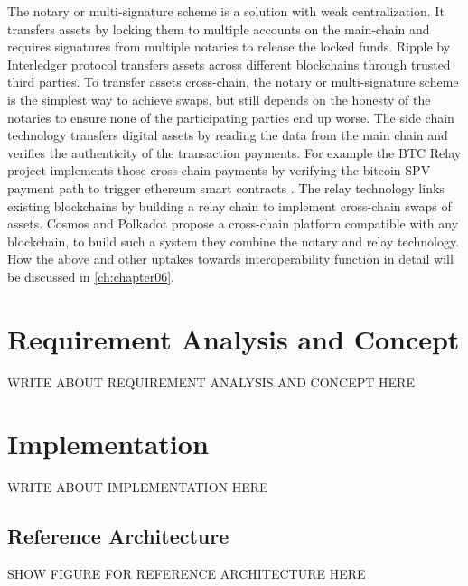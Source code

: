 The notary or multi-signature scheme is a solution with weak centralization. It transfers assets by locking them to multiple accounts on the main-chain and requires signatures from multiple notaries to release the locked funds. Ripple by Interledger protocol \cite{hope2016interledger} transfers assets across different blockchains through trusted third parties. To transfer assets cross-chain, the notary or multi-signature scheme is the simplest way to achieve swaps, but still depends on the honesty of the notaries to ensure none of the participating parties end up worse. The side chain technology transfers digital assets by reading the data from the main chain and verifies the authenticity of the transaction payments. For example the BTC Relay  project implements those cross-chain payments by verifying the bitcoin \ac{SPV} payment path to trigger ethereum smart contracts \cite{buterin2014ethereum}. The relay technology links existing blockchains by building a relay chain to implement cross-chain swaps of assets. Cosmos \cite{kwon2018network} and Polkadot \cite{wood2016polkadot} propose a cross-chain platform compatible with any blockchain, to build such a system they combine the notary and relay technology. How the above and other uptakes towards interoperability function in detail will be discussed in \autoref{ch:chapter06}.


\chapter{Requirement Analysis and Concept}
\label{ch:chapter04}
WRITE ABOUT REQUIREMENT ANALYSIS AND CONCEPT HERE

\chapter{Implementation}
\label{ch:chapter05}
WRITE ABOUT IMPLEMENTATION HERE

\section{Reference Architecture}
\label{sec:chapter05:ref_architecture}

SHOW FIGURE FOR REFERENCE ARCHITECTURE HERE
%
%
